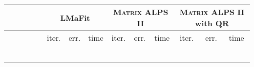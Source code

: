 \documentclass[twocolumn]{svjour3}
\begin{document}
\begin{table*} [!htp]
\begin{center}
\begin{tabular}{|c|c|c|c|c|c|c|c|c|c|c|c|c|c}
\multicolumn{4}{c|}{} & & \multicolumn{3}{|c|}{LMaFit} & \multicolumn{3}{|c}{\textsc{Matrix ALPS II}} & \multicolumn{3}{|c}{\textsc{Matrix ALPS II} with QR}  \\
\hline \hline
\multicolumn{1}{c}{}  & \multicolumn{1}{c}{} & \multicolumn{1}{c}{} & \multicolumn{1}{c|}{} & & 
\multicolumn{1}{|c}{\rm{iter.}} & \multicolumn{1}{c}{\rm{err.}} & \multicolumn{1}{c|}{\rm{time}} &
\multicolumn{1}{|c}{\rm{iter.}} & \multicolumn{1}{c}{\rm{err.}} & \multicolumn{1}{c|}{\rm{time}} &
\multicolumn{1}{|c}{\rm{iter.}} & \multicolumn{1}{c}{\rm{err.}} & \multicolumn{1}{c}{\rm{time}}  \\
\hline\hline
\multicolumn{1}{c}{} & \multicolumn{1}{c}{} & \multicolumn{1}{c}{}  & \multicolumn{1}{c|}{} &  & 
\multicolumn{1}{|c}{} & \multicolumn{1}{c}{} & \multicolumn{1}{c|}{} &
\multicolumn{1}{|c}{} & \multicolumn{1}{c}{} & \multicolumn{1}{c}{} &
\multicolumn{1}{|c}{} & \multicolumn{1}{c}{} & \multicolumn{1}{c}{} \\
\hline
\multicolumn{1}{c}{} & \multicolumn{1}{c}{} & \multicolumn{1}{c}{}  & \multicolumn{1}{c|}{} &  & 
\multicolumn{1}{|c}{} & \multicolumn{1}{c}{} & \multicolumn{1}{c|}{} &
\multicolumn{1}{|c}{} & \multicolumn{1}{c}{} & \multicolumn{1}{c}{} &
\multicolumn{1}{|c}{} & \multicolumn{1}{c}{} & \multicolumn{1}{c}{} \\
\hline
\multicolumn{1}{c}{} & \multicolumn{1}{c}{} & \multicolumn{1}{c}{}  & \multicolumn{1}{c|}{} &  & 
\multicolumn{1}{|c}{} & \multicolumn{1}{c}{} & \multicolumn{1}{c|}{} &
\multicolumn{1}{|c}{} & \multicolumn{1}{c}{} & \multicolumn{1}{c}{} &
\multicolumn{1}{|c}{} & \multicolumn{1}{c}{} & \multicolumn{1}{c}{} \\
\hline
\multicolumn{1}{c}{} & \multicolumn{1}{c}{} & \multicolumn{1}{c}{}  & \multicolumn{1}{c|}{} &  & 
\multicolumn{1}{|c}{} & \multicolumn{1}{c}{} & \multicolumn{1}{c|}{} &
\multicolumn{1}{|c}{} & \multicolumn{1}{c}{} & \multicolumn{1}{c}{} &
\multicolumn{1}{|c}{} & \multicolumn{1}{c}{} & \multicolumn{1}{c}{} \\
\hline
\multicolumn{1}{c}{} & \multicolumn{1}{c}{} & \multicolumn{1}{c}{}  & \multicolumn{1}{c|}{} &  & 
\multicolumn{1}{|c}{} & \multicolumn{1}{c}{} & \multicolumn{1}{c|}{} &
\multicolumn{1}{|c}{} & \multicolumn{1}{c}{} & \multicolumn{1}{c}{} &
\multicolumn{1}{|c}{} & \multicolumn{1}{c}{} & \multicolumn{1}{c}{} \\
\hline
\multicolumn{1}{c}{} & \multicolumn{1}{c}{} & \multicolumn{1}{c}{}  & \multicolumn{1}{c|}{} &  & 
\multicolumn{1}{|c}{} & \multicolumn{1}{c}{} & \multicolumn{1}{c|}{} &

\end{tabular}
\end{center}
\end{table*}
\end{document}
